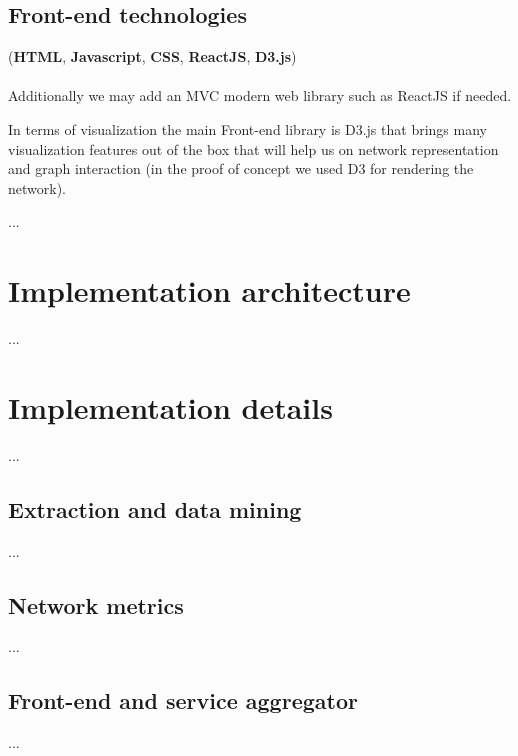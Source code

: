 \subsection{Front-end technologies}
(\textbf{HTML}, \textbf{Javascript}, \textbf{CSS}, \textbf{ReactJS}, \textbf{D3.js})\\
\\
Additionally we may add an MVC modern web library such as ReactJS if needed.

In terms of visualization the main Front-end library is D3.js that brings many visualization features out of the box that will help us on
network representation and graph interaction (in the proof of concept we used D3 for rendering the network).

...
\section{Implementation architecture}
...
\section{Implementation details}
...
\subsection{Extraction and data mining}
...
\subsection{Network metrics}
...
\subsection{Front-end and service aggregator}
...
